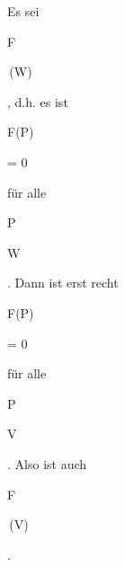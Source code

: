 {


Es sei


\mavergleichskette


{\vergleichskette


{ F
}


{ \in }{  \,(W)
}


{  }{
}


{    }{
}


{   }{
}


}
{}{}{,}
d.h. es ist


\mavergleichskette


{\vergleichskette


{ F(P)
}


{ = }{ 0
}


{  }{
}


{    }{
}


{   }{
}


}
{}{}{}
für alle


\mavergleichskette


{\vergleichskette


{ P
}


{ \in }{ W
}


{  }{
}


{    }{
}


{   }{
}


}
{}{}{.}
Dann ist erst recht


\mavergleichskette


{\vergleichskette


{ F(P)
}


{ = }{ 0
}


{  }{
}


{    }{
}


{   }{
}


}
{}{}{}
für alle


\mavergleichskette


{\vergleichskette


{ P
}


{ \in }{ V
}


{  }{
}


{    }{
}


{   }{
}


}
{}{}{.}
Also ist auch


\mavergleichskette


{\vergleichskette


{ F
}


{ \in }{  \,(V)
}


{  }{
}


{    }{
}


{   }{
}


}
{}{}{.}


}



